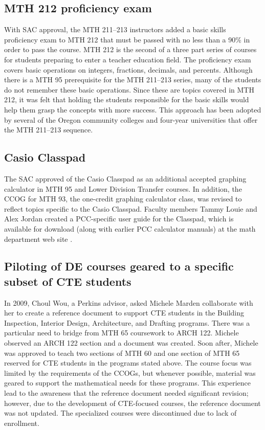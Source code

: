 \subsection{MTH 212 proficiency exam}
With SAC approval, the MTH 211--213 instructors added a basic skills proficiency
exam to MTH 212 that must be passed with no less than a 90\% in order to pass
the course.  MTH 212 is the second of a three part series of courses for
students preparing to enter a teacher education field. The proficiency exam
covers basic operations on integers, fractions, decimals, and percents.
Although there is a MTH 95 prerequisite for the MTH 211--213 series, many of the
students do not remember these basic operations. Since these are topics covered
in MTH 212, it was felt that holding the students responsible for the basic
skills would help them grasp the concepts with more success.  This approach has
been adopted by several of the Oregon community colleges and four-year
universities that offer the MTH 211--213 sequence.

\subsection{Casio Classpad}
The SAC approved of the Casio Classpad as an additional accepted graphing
calculator in MTH 95 and Lower Division Transfer courses. In addition, the CCOG
for MTH 93, the one-credit graphing calculator class, was revised to reflect topics
specific to the Casio Classpad. Faculty members Tammy Louie and Alex Jordan
created a PCC-specific user guide for the Classpad, which is available for
download (along with earlier PCC calculator manuals) at the math department web
site \cite{pccmathdept}.

\subsection{Piloting of DE courses geared to a specific subset of CTE students}
In 2009, Choul Wou, a Perkins advisor, asked Michele Marden collaborate with
her to create a reference document to support CTE students in the Building
Inspection, Interior Design, Architecture, and Drafting programs. There was a
particular need to bridge from MTH 65 coursework to ARCH 122. Michele observed
an ARCH 122 section and a document was created. Soon after, Michele was
approved to teach two sections of MTH 60 and one section of MTH 65 reserved for
CTE students in the programs stated above. The course focus was limited by the
requirements of the CCOGs, but whenever possible, material was geared to
support the mathematical needs for these programs. This experience lead to the
awareness that the reference document needed significant revision; however, due
to the development of CTE-focused courses, the reference document was not
updated. The specialized courses were discontinued due to lack of enrollment.
